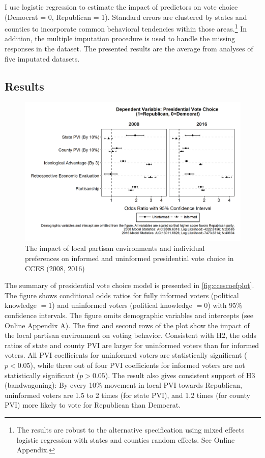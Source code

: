 \documentclass[letterpaper, 12pt]{article}
\begin{document}
    \par I use logistic regression to estimate the impact of predictors on vote choice (Democrat = 0, Republican = 1). Standard errors are clustered by states and counties to incorporate common behavioral tendencies within those areas.\footnote{The results are robust to the alternative specification using mixed effects logistic regression with states and counties random effects. See Online Appendix.} In addition, the multiple imputation procedure \citep{King2001anin} is used to handle the missing responses in the dataset. The presented results are the average from analyses of five imputated datasets.
    
    \subsection*{Results}
    
    \begin{figure}[t!]
        \caption{The impact of local partisan environments and individual preferences on informed and uninformed presidential vote choice in CCES (2008, 2016)}
        \label{fig:ccescoefplot}
        \includegraphics[width=\linewidth]{../outputs/ccescoefplot.png}
    \end{figure}

    \par The summary of presidential vote choice model is presented in \autoref{fig:ccescoefplot}. The figure shows conditional odds ratios for fully informed voters (political knowledge $= 1$) and uninformed voters (political knowledge $= 0$) with 95\% confidence intervals. The figure omits demographic variables and intercepts (see Online Appendix A). The first and second rows of the plot show the impact of the local partisan environment on voting behavior. Consistent with H2, the odds ratios of state and county PVI are larger for uninformed voters than for informed voters. All PVI coefficients for uninformed voters are statistically significant ($p<0.05$), while three out of four PVI coefficients for informed voters are not statistically significant ($p>0.05$). The result also gives consistent support of H3 (bandwagoning): By every 10\% movement in local PVI towards Republican, uninformed voters are 1.5 to 2 times (for state PVI), and 1.2 times (for county PVI) more likely to vote for Republican than Democrat.
    
\end{document}

